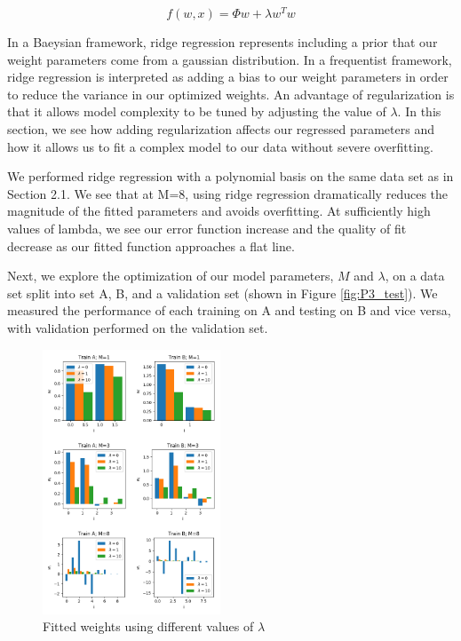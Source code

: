 \documentclass[10pt]{article}
\begin{document}
$$f(w,x) = \Phi w + \lambda w^Tw$$

In a Baeysian framework, ridge regression represents including a prior that our weight parameters come from a gaussian distribution. In a frequentist framework, ridge regression is interpreted as adding a bias to our weight parameters in order to reduce the variance in our optimized weights. An advantage of regularization is that it allows model complexity to be tuned by adjusting the value of $\lambda$. In this section, we see how adding regularization affects our regressed parameters and how it allows us to fit a complex model to our data without severe overfitting.


We performed ridge regression with a polynomial basis on the same data set as in Section 2.1. We see that at M=8, using ridge regression dramatically reduces the magnitude of the fitted parameters and avoids overfitting. At sufficiently high values of lambda, we see our error function increase and the quality of fit decrease as our fitted function approaches a flat line.


Next, we explore the optimization of our model parameters, $M$ and $\lambda$, on a data set split into set A, B, and a validation set (shown in Figure \ref{fig:P3_test}). We measured the performance of each training on A and testing on B and vice versa, with validation performed on the validation set.

\begin{figure}
\caption{Fitted weights using different values of $\lambda$}
\begin{center}
\includegraphics[width=200px]{P3_all_weights}
\end{center}
\label{fig:P3_all_weights}
\end{figure}
\end{document}

